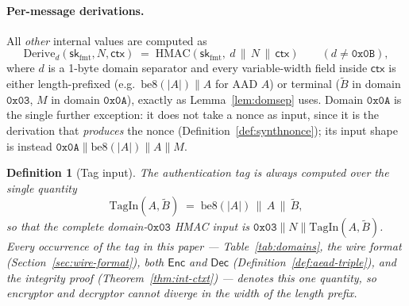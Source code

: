 \documentclass[11pt,a4paper]{article}
\newtheorem{definition}[theorem]{Definition}
\begin{document}
\paragraph{Per-message derivations.}
All \emph{other} internal values are computed as
\[
  \mathrm{Derive}_d(\mathsf{sk}_{\mathrm{fmt}}, N, \mathsf{ctx})
    \;=\;
  \mathrm{HMAC}\!\left(\mathsf{sk}_{\mathrm{fmt}},\ d\,\|\,N\,\|\,\mathsf{ctx}\right)
  \qquad (d \neq \texttt{0x0B}),
\]
where $d$ is a 1-byte domain separator and every variable-width field
inside $\mathsf{ctx}$ is either length-prefixed (e.g.\ $\mathrm{be8}(|A|) \| A$
for AAD $A$) or terminal ($\widetilde{B}$ in domain $\texttt{0x03}$, $M$
in domain $\texttt{0x0A}$), exactly as Lemma~\ref{lem:domsep} uses. Domain $\texttt{0x0A}$ is the single further exception: it
does not take a nonce as input, since it is the derivation that
\emph{produces} the nonce (Definition~\ref{def:synthnonce}); its input
shape is instead $\texttt{0x0A}\|\mathrm{be8}(|A|)\|A\|M$.

\begin{definition}[Tag input]\label{def:taginput}
The authentication tag is always computed over the single quantity
\[
  \mathrm{TagIn}(A, \widetilde{B}) \;=\; \mathrm{be8}(|A|) \,\|\, A \,\|\, \widetilde{B},
\]
so that the complete domain-$\texttt{0x03}$ HMAC input is
$\texttt{0x03}\|N\|\mathrm{TagIn}(A,\widetilde{B})$. Every occurrence of the
tag in this paper — Table~\ref{tab:domains}, the wire format
(Section~\ref{sec:wire-format}), both $\mathsf{Enc}$ and $\mathsf{Dec}$
(Definition~\ref{def:aead-triple}), and the integrity proof
(Theorem~\ref{thm:int-ctxt}) — denotes this one quantity, so encryptor and
decryptor cannot diverge in the width of the length prefix.
\end{definition}
\end{document}
